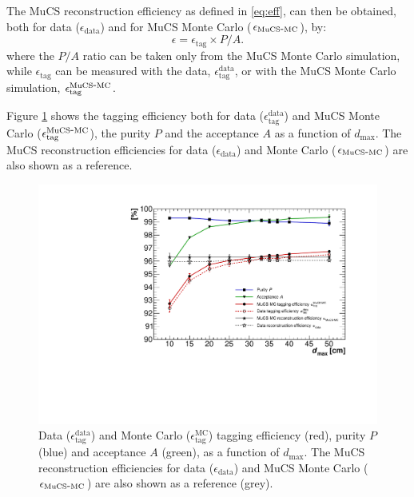 \documentclass[a4paper,11pt]{article}
\def\myhyphen{{\hbox{-}}}
\begin{document}
The MuCS reconstruction efficiency as defined in \eqref{eq:eff}, can then be obtained, both for data ($\epsilon_{\mathrm{data}}$) and for MuCS Monte Carlo ($\epsilon_{\mathrm{MuCS\myhyphen MC}}$), by:
\begin{equation}\label{eq:mceff}
  \epsilon = \epsilon_{\mathrm{tag}} \times P / A.
\end{equation}
where the $P/A$ ratio can be taken only from the MuCS Monte Carlo simulation, while $\epsilon_{\mathrm{tag}}$ can be measured with the data, $\epsilon^{\mathrm{data}}_{\mathrm{tag}}$, or with the MuCS Monte Carlo simulation, $\epsilon^{\mathrm{MuCS\myhyphen MC}}_{\mathrm{tag}}$.

Figure \ref{fig:purity} shows the tagging efficiency both for data ($\epsilon^{\mathrm{data}}_{\mathrm{tag}}$) and MuCS Monte Carlo  ($\epsilon^{\mathrm{MuCS\myhyphen MC}}_{\mathrm{tag}}$), the purity $P$ and the acceptance $A$ as a function of $d_{\mathrm{max}}$. The MuCS reconstruction efficiencies for data ($\epsilon_{\mathrm{data}}$) and Monte Carlo ($\epsilon_{\mathrm{MuCS\myhyphen MC}}$) are also shown as a reference.

\begin{figure}[htbp]
  \begin{center}
    \includegraphics[width=0.7\linewidth]{figures/purity.pdf}
    \caption{Data ($\epsilon^{\mathrm{data}}_{\mathrm{tag}}$) and Monte Carlo ($\epsilon^{\mathrm{MC}}_{\mathrm{tag}}$) tagging efficiency (red), purity $P$ (blue) and acceptance $A$ (green), as a function of $d_{\mathrm{max}}$. The MuCS reconstruction efficiencies for data ($\epsilon_{\mathrm{data}}$) and MuCS Monte Carlo ($\epsilon_{\mathrm{MuCS\myhyphen MC}}$) are also shown as a reference (grey).} \label{fig:purity}
  \end{center}
\end{figure}
\end{document}
